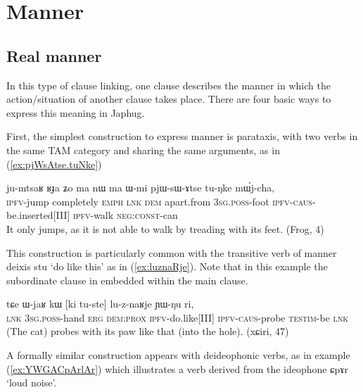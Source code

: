 \documentclass[oldfontcommands,oneside,a4paper,11pt]{article}
\newcommand{\ipa}[1]{{\phon \mbox{#1}}} %
\newcommand{\refb}[1]{(\ref{#1})}
\begin{document}
%
% 
	 
	 

\section{Manner} \label{sec:manner}

 
\subsection{Real manner}
In this type of clause linking, one clause describes the manner in which the action/situation of another clause takes place. There are four basic ways to express this meaning in Japhug.

First, the simplest construction to express manner is  parataxis, with    two verbs  in the same TAM category and sharing the same arguments, as in \refb{ex:pjWsAtse.tuNke}

\begin{exe}
\ex \label{ex:pjWsAtse.tuNke}
\gll
\ipa{ju-mtsaʁ} 	\ipa{ʁɟa} 	\ipa{ʑo} 	\ipa{ma} 	\ipa{nɯ} 	\ipa{ma} 	\ipa{ɯ-mi} 	\ipa{pjɯ-sɯ-ɤtse} 	\ipa{tu-ŋke} 	\ipa{mɯ́j-cha,} \\
\textsc{ipfv}-jump completely \textsc{emph} \textsc{lnk} \textsc{dem} apart.from \textsc{3sg.poss}-foot \textsc{ipfv-caus}-be.inserted[III] \textsc{ipfv}-walk \textsc{neg:const}-can \\
\glt It only jumps, as it is not able to walk by treading with its feet.  (Frog, 4)
\end{exe}

This construction is particularly common with the transitive verb of manner deixis \ipa{stu} `do like this' as in \refb{ex:luznaRje}. Note that in this example the subordinate clause in embedded within the main clause.

\begin{exe}
\ex \label{ex:luznaRje}
\gll
\ipa{tɕe} 	\ipa{ɯ-jaʁ} 	\ipa{kɯ} 	[\ipa{ki} 	\ipa{tu-ste}] 	\ipa{lu-z-naʁje} 	\ipa{ɲɯ-ŋu} 	\ipa{ri,} \\
\textsc{lnk} \textsc{3sg.poss}-hand \textsc{erg} \textsc{dem:prox} \textsc{ipfv}-do.like[III] \textsc{ipfv-caus}-probe \textsc{testim}-be \textsc{lnk} \\
\glt (The cat) probes with its paw like that (into the hole). (xɕiri, 47)
\end{exe}
A formally similar construction appears with deideophonic verbs, as in example \refb{ex:YWGACpArlAr} which illustrates a   verb derived from the ideophone \ipa{ɕpɤr} `loud noise'.  
\end{document}
